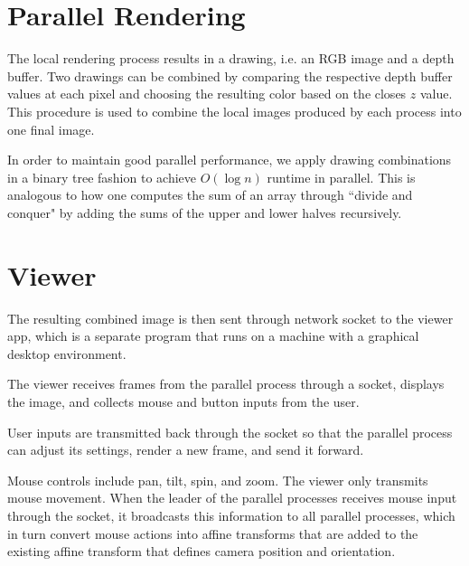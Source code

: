 \documentclass{article}
\begin{document}
\section{Parallel Rendering}

The local rendering process results in a drawing,
i.e. an RGB image and a depth buffer.
Two drawings can be combined by comparing the
respective depth buffer values at each pixel
and choosing the resulting color based on the
closes $z$ value.
This procedure is used to combine the local images
produced by each process into one final image.

In order to maintain good parallel performance,
we apply drawing combinations in a binary tree
fashion to achieve $O(\log n)$ runtime in parallel. 
This is analogous to how one computes the sum
of an array through ``divide and conquer" by
adding the sums of the upper and lower halves
recursively.

\section{Viewer}

The resulting combined image is then sent
through network socket to the viewer app,
which is a separate program that runs on
a machine with a graphical desktop environment.

The viewer receives frames from the parallel
process through a socket, displays the image,
and collects mouse and button inputs from
the user.

User inputs are transmitted back through the
socket so that the parallel process can
adjust its settings, render a new frame,
and send it forward.

Mouse controls include pan, tilt, spin, and zoom.
The viewer only transmits mouse movement.
When the leader of the parallel processes
receives mouse input through the socket,
it broadcasts this information to all parallel
processes, which in turn convert mouse
actions into affine transforms that are added
to the existing affine transform that
defines camera position and orientation.
\end{document}
